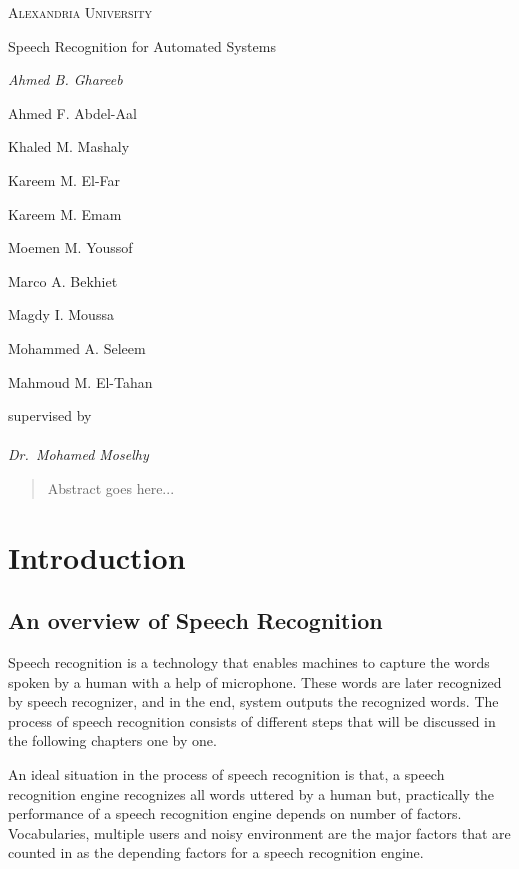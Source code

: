 \documentclass[12pt, a4paper, twoside]{report}
\begin{document}
\begin{titlepage}
	\begin{flushright}
		{\scshape Alexandria University\\}
		{\huge Speech Recognition for Automated Systems\par}
	\end{flushright}
	\vfill
	{\Large\itshape
		Ahmed B. Ghareeb\par
		Ahmed F. Abdel-Aal\par
		Khaled M. Mashaly\par
		Kareem M. El-Far\par
		Kareem M. Emam\par
		Moemen M. Youssof\par
		Marco A. Bekhiet\par
		Magdy I. Moussa\par
		Mohammed A. Seleem\par
		Mahmoud M. El-Tahan\par
	}
	\vspace{1cm}
	supervised by\\ \\
	{\Large\itshape Dr.~Mohamed Moselhy}
\end{titlepage}

\begin{abstract}
Abstract goes here...
\end{abstract}

\printglossary[type=\acronymtype]

\tableofcontents

\chapter{Introduction}
\section{An overview of Speech Recognition}
Speech recognition is a technology that enables machines to capture the words spoken by a human with a help of microphone. These words are later recognized by speech recognizer, and in the end, system outputs the recognized words. The process of speech recognition consists of different steps that will be discussed in the following chapters one by one.
\par
An ideal situation in the process of speech recognition is that, a speech recognition engine recognizes all words uttered by a human but, practically the performance of a speech recognition engine depends on number of factors. Vocabularies, multiple users and noisy environment are the major factors that are counted in as the depending factors for a speech recognition engine.
\end{document}
